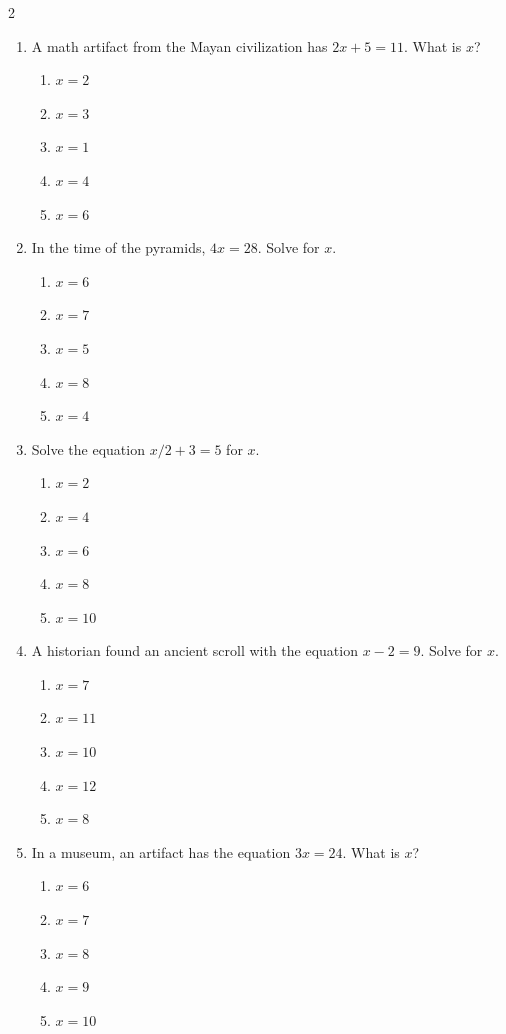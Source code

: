 \documentclass[10pt]{article}
\begin{document}
\begin{multicols}{2}
\begin{enumerate}[label=\textbf{Q\arabic*.}, leftmargin=*, itemsep=6pt, parsep=0pt]
  \item \small A math artifact from the Mayan civilization has $2x + 5 = 11$. What is $x$?
  \begin{enumerate}[label=(\Alph*), leftmargin=0.6cm, nosep, itemsep=2pt]
    \item $x = 2$
    \item $x = 3$
    \item $x = 1$
    \item $x = 4$
    \item $x = 6$
  \end{enumerate}

  \item \small In the time of the pyramids, $4x = 28$. Solve for $x$.
  \begin{enumerate}[label=(\Alph*), leftmargin=0.6cm, nosep, itemsep=2pt]
    \item $x = 6$
    \item $x = 7$
    \item $x = 5$
    \item $x = 8$
    \item $x = 4$
  \end{enumerate}

  \item \small Solve the equation $x/2 + 3 = 5$ for $x$.
  \begin{enumerate}[label=(\Alph*), leftmargin=0.6cm, nosep, itemsep=2pt]
    \item $x = 2$
    \item $x = 4$
    \item $x = 6$
    \item $x = 8$
    \item $x = 10$
  \end{enumerate}

  \item \small A historian found an ancient scroll with the equation $x - 2 = 9$. Solve for $x$.
  \begin{enumerate}[label=(\Alph*), leftmargin=0.6cm, nosep, itemsep=2pt]
    \item $x = 7$
    \item $x = 11$
    \item $x = 10$
    \item $x = 12$
    \item $x = 8$
  \end{enumerate}

  \item \small In a museum, an artifact has the equation $3x = 24$. What is $x$?
  \begin{enumerate}[label=(\Alph*), leftmargin=0.6cm, nosep, itemsep=2pt]
    \item $x = 6$
    \item $x = 7$
    \item $x = 8$
    \item $x = 9$
    \item $x = 10$
  \end{enumerate}

\end{enumerate}
\end{multicols}
\end{document}
